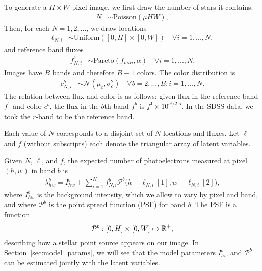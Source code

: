 To generate a $H \times W$ pixel image, we first draw the number of stars it contains:
\begin{align}
	N &\sim \text{Poisson}(\mu HW),
\end{align}
Then, for each $N = 1, 2, ... $, we draw locations 
\begin{align}
  \ell_{N, i} &\sim \text{Uniform}([0, H] \times [0, W]) \quad \forall i = 1, ..., N, 
 \end{align}
 and reference band fluxes
 \begin{align}
  f_{N, i}^{1} & \sim \text{Pareto}(f_{min}, \alpha) \quad \forall i = 1, ..., N. 
  \label{eq:flux_prior}
\end{align}
Images have $B$ bands and therefore $B - 1$ colors. The color distribution is
\begin{align}
  c_{N, i}^{b}  & \sim \mathcal{N}(\mu_c, \sigma^2_c) \quad \forall b = 2, ..., B; i = 1, ..., N.
\end{align}
The relation between flux and color is as follows: 
given flux in the reference band $f^1$ and color $c^b$,
the flux in the $b$th band $f^b$ is $f^1 \times 10^{c^b / 2.5}$.
In the SDSS data, we took the $r$-band to be the reference band.

Each value of $N$ corresponds to a disjoint set of $N$ locations and fluxes.
Let $\ell$ and $f$ (without subscripts) each denote the triangular array of latent variables.

Given $N$, $\ell$, and $f$, the expected number of photoelectrons measured at pixel $(h,w)$ in band $b$ is
\begin{align}
  \lambda^b_{hw} = I^{b}_{hw} + \sum_{i = 1}^N f_{N, i}^b \mathcal{P}^b\big(h - \ell_{N, i}[1], w - \ell_{N,i}[2]\big),
  \label{eq:expected_intensity}
\end{align}
where $I^{b}_{hw}$ is the background intensity, which we allow to vary by pixel and band,
and where $\mathcal{P}^b$ is the point spread function (PSF) for band $b$. The PSF
is a function
\begin{align}
\mathcal{P}^b : [0, H] \times [0, W] \mapsto \mathbb{R}^+,
\end{align}
describing how a stellar point source appears
on our image. In Section~\ref{sec:model_params}, we will see 
that the model
parameters $I^{b}_{hw}$ and $\mathcal{P}^b$
can be estimated jointly with
the latent variables.

